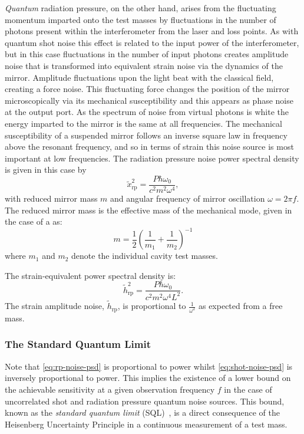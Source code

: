 \emph{Quantum} radiation pressure, on the other hand, arises from the fluctuating momentum imparted onto the test masses by fluctuations in the number of photons present within the interferometer from the laser and loss points. As with quantum shot noise this effect is related to the input power of the interferometer, but in this case fluctuations in the number of input photons creates amplitude noise that is transformed into equivalent strain noise via the dynamics of the mirror. Amplitude fluctuations upon the light beat with the classical field, creating a force noise. This fluctuating force changes the position of the mirror microscopically via its mechanical susceptibility and this appears as phase noise at the output port. As the spectrum of noise from virtual photons is white the energy imparted to the mirror is the same at all frequencies. The mechanical susceptibility of a suspended mirror follows an inverse square law in frequency above the resonant frequency, and so in terms of strain this noise source is most important at low frequencies. The radiation pressure noise power spectral density is given in this case by
\begin{equation}
  \label{eq:rp-noise-psd}
  \tilde{x}^2_{\text{rp}} = \frac{P \hbar \omega_0}{c^2 m^2 \omega^4},
\end{equation}
with reduced mirror mass $m$ and angular frequency of mirror oscillation $\omega = 2 \pi f$. The reduced mirror mass is the effective mass of the mechanical mode, given in the case of a \FPMI{} as:
\begin{equation}
  m = \frac{1}{2} \left(\frac{1}{m_1} + \frac{1}{m_2} \right)^{-1}
\end{equation}
where $m_1$ and $m_2$ denote the individual cavity test masses.

The strain-equivalent power spectral density is:
\begin{equation}
  \tilde{h}^2_{\text{rp}} = \frac{P \hbar \omega_0}{c^2 m^2 \omega^4 L^2}.
\end{equation}
The strain amplitude noise, $\tilde{h}_{\text{rp}}$, is proportional to $\frac{1}{\omega^2}$ as expected from a free mass.

\subsubsection{\label{sec:sql}The Standard Quantum Limit}
Note that \cref{eq:rp-noise-psd} is proportional to power whilst \cref{eq:shot-noise-psd} is inversely proportional to power. This implies the existence of a lower bound on the achievable sensitivity at a given observation frequency $f$ in the case of uncorrelated shot and radiation pressure quantum noise sources. This bound, known as the \emph{standard quantum limit} (\gls{SQL})~\cite{Braginsky1967}, is a direct consequence of the Heisenberg Uncertainty Principle in a continuous measurement of a test mass.


